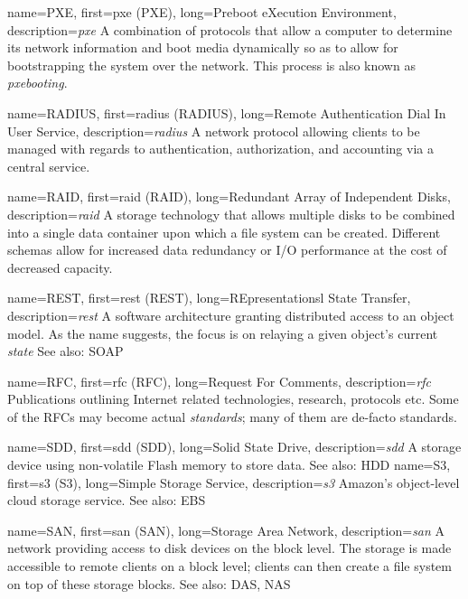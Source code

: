 {
	name={PXE},
	first={\acrlong{pxe} (PXE)},
	long={Preboot eXecution Environment},
	description={{\em \acrlong{pxe}} A combination of protocols
that allow a computer to determine its network information and boot media
dynamically so as to allow for bootstrapping the system over the network.
This process is also known as {\em pxebooting}.}
}

{
	name={RADIUS},
	first={\acrlong{radius} (RADIUS)},
	long={Remote Authentication Dial In User Service},
	description={{\em \acrlong{radius}} A network
protocol allowing clients to be managed with regards to authentication,
authorization, and accounting via a central service.}
}

{
	name={RAID},
	first={\acrlong{raid} (RAID)},
	long={Redundant Array of Independent Disks},
	description={{\em \acrlong{raid}} A storage
technology that allows multiple disks to be combined into a single data
container upon which a file system can be created.  Different schemas allow
for increased data redundancy or I/O performance at the cost of decreased
capacity.}
}

{
	name={REST},
	first={\acrlong{rest} (REST)},
	long={REpresentationsl State Transfer},
	description={{\em \acrlong{rest}} A software architecture
granting distributed access to an object model.  As the name suggests, the
focus is on relaying a given object's current {\em state} See also: SOAP}
}

{
	name={RFC},
	first={\acrlong{rfc} (RFC)},
	long={Request For Comments},
	description={{\em \acrlong{rfc}} Publications outlining Internet
related technologies, research, protocols etc.  Some of the RFCs may
become actual {\em standards}; many of them are de-facto standards.}
}

{
	name={SDD},
	first={\acrlong{sdd} (SDD)},
	long={Solid State Drive},
	description={{\em \acrlong{sdd}} A
storage device using non-volatile Flash memory to
store data.  See also: HDD}
}
{
	name={S3},
	first={\acrlong{s3} (S3)},
	long={Simple Storage Service},
	description={{\em \acrlong{s3}} Amazon's object-level cloud storage
service.  See also: EBS}
}

{
	name={SAN},
	first={\acrlong{san} (SAN)},
	long={Storage Area Network},
	description={{\em \acrlong{san}} A network providing access to disk
devices on the block level.  The storage is made accessible to remote
clients on a block level; clients can then create a file system on top of
these storage blocks.  See also: DAS, NAS}
}

